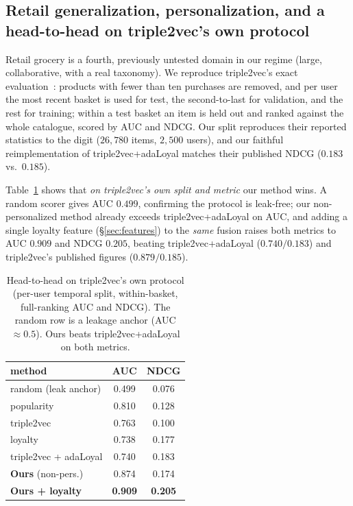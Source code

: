 \subsection{Retail generalization, personalization, and a head-to-head on triple2vec's own protocol}
\label{sec:retail}
Retail grocery is a fourth, previously untested domain in our regime (large, collaborative, with a real
taxonomy). We reproduce triple2vec's exact evaluation~\cite{triple2vec}: products with fewer than ten purchases are
removed, and per user the most recent basket is used for test, the second-to-last for validation, and the rest for
training; within a test basket an item is held out and ranked against the whole catalogue, scored by AUC and NDCG.
Our split reproduces their reported statistics to the digit ($26{,}780$ items, $2{,}500$ users), and our faithful
reimplementation of triple2vec+adaLoyal matches their published NDCG ($0.183$ vs.\ $0.185$).

Table~\ref{tab:retail} shows that \emph{on triple2vec's own split and metric} our method wins. A random
scorer gives AUC $0.499$, confirming the protocol is leak-free; our non-personalized method already exceeds
triple2vec+adaLoyal on AUC, and adding a single loyalty feature (\S\ref{sec:features}) to the \emph{same} fusion
raises both metrics to AUC $0.909$ and NDCG $0.205$, beating triple2vec+adaLoyal ($0.740/0.183$) and triple2vec's
published figures ($0.879/0.185$).

\begin{table}[t]\centering\small
\caption{Head-to-head on triple2vec's own protocol (per-user temporal split, within-basket, full-ranking AUC
and NDCG). The random row is a leakage anchor (AUC $\approx 0.5$). Ours beats triple2vec+adaLoyal on both
metrics.}
\label{tab:retail}
\begin{tabular}{lcc}
\toprule
method & AUC & NDCG \\
\midrule
random (leak anchor)  & 0.499 & 0.076 \\
popularity            & 0.810 & 0.128 \\
triple2vec            & 0.763 & 0.100 \\
loyalty               & 0.738 & 0.177 \\
triple2vec + adaLoyal & 0.740 & 0.183 \\
\textbf{Ours} (non-pers.) & 0.874 & 0.174 \\
\textbf{Ours + loyalty}   & \textbf{0.909} & \textbf{0.205} \\
\bottomrule
\end{tabular}
\end{table}

